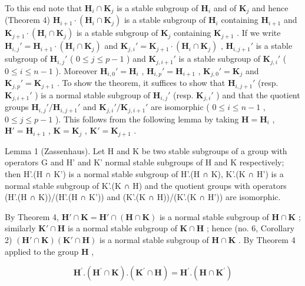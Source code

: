 To this end note that \(\mathbf{H}_i \cap \mathbf{K}_j\) is a stable subgroup of \(\mathbf{H}_i\) and of \(\mathbf{K}_j\) and hence (Theorem 4) \(\mathbf{H}_{i+1} \cdot (\mathbf{H}_i \cap \mathbf{K}_j)\) is a stable subgroup of \(\mathbf{H}_i\) containing \(\mathbf{H}_{i+1}\) and \(\mathbf{K}_{j+1} \cdot (\mathbf{H}_i \cap \mathbf{K}_j)\) is a stable subgroup of \(\mathbf{K}_j\) containing \(\mathbf{K}_{j+1}\) . If we write \(\mathbf{H}_{i,j}' = \mathbf{H}_{i+1} \cdot (\mathbf{H}_i \cap \mathbf{K}_j)\) and \(\mathbf{K}_{j,i}' = \mathbf{K}_{j+1} \cdot (\mathbf{H}_i \cap \mathbf{K}_j)\) , \(\mathbf{H}_{i,j+1}'\) is a stable subgroup of \(\mathbf{H}_{i,j}'\) ( \(0 \leqslant j \leqslant p-1\) ) and \(\mathbf{K}_{j,i+1}'\) is a stable subgroup of \(\mathbf{K}_{j,i}'\) ( \(0 \leqslant i \leqslant n-1\) ). Moreover \(\mathbf{H}_{i,0}' = \mathbf{H}_i\) , \(\mathbf{H}_{i,p}' = \mathbf{H}_{i+1}\) , \(\mathbf{K}_{j,0}' = \mathbf{K}_j\) and \(\mathbf{K}_{j,p}' = \mathbf{K}_{j+1}\) . To show the theorem, it suffices to show that \(\mathbf{H}_{i,j+1}'\) (resp. \(\mathbf{K}_{j,i+1}'\) ) is a normal stable subgroup of \(\mathbf{H}_{i,j}'\) (resp. \(\mathbf{K}_{j,i}'\) ) and that the quotient groups \(\mathbf{H}_{i,j}'/\mathbf{H}_{i,j+1}'\) and \(\mathbf{K}_{j,i}'/\mathbf{K}_{j,i+1}'\) are isomorphic ( \(0 \leqslant i \leqslant n-1\) , \(0 \leqslant j \leqslant p-1\) ). This follows from the following lemma by taking \(\mathbf{H} = \mathbf{H}_i\) , \(\mathbf{H}' = \mathbf{H}_{i+1}\) , \(\mathbf{K} = \mathbf{K}_j\) , \(\mathbf{K}' = \mathbf{K}_{j+1}\) .

Lemma 1 (Zassenhaus). Let H and K be two stable subgroups of a group with operators G and H' and K' normal stable subgroups of H and K respectively; then H'.(H ∩ K') is a normal stable subgroup of H'.(H ∩ K), K'.(K ∩ H') is a normal stable subgroup of K'.(K ∩ H) and the quotient groups with operators (H'.(H ∩ K))/(H'.(H ∩ K')) and (K'.(K ∩ H))/(K'.(K ∩ H')) are isomorphic.

By Theorem 4, \(\mathbf{H}' \cap \mathbf{K} = \mathbf{H}' \cap (\mathbf{H} \cap \mathbf{K})\) is a normal stable subgroup of \(\mathbf{H} \cap \mathbf{K}\) ; similarly \(\mathbf{K}' \cap \mathbf{H}\) is a normal stable subgroup of \(\mathbf{K} \cap \mathbf{H}\) ; hence (no. 6, Corollary 2) \((\mathbf{H}' \cap \mathbf{K})(\mathbf{K}' \cap \mathbf{H})\) is a normal stable subgroup of \(\mathbf{H} \cap \mathbf{K}\) . By Theorem 4 applied to the group \(\mathbf{H}\) ,

\[
\mathbf {H} ^ {\prime}. (\mathbf {H} ^ {\prime} \cap \mathbf {K}). (\mathbf {K} ^ {\prime} \cap \mathbf {H}) = \mathbf {H} ^ {\prime}. (\mathbf {H} \cap \mathbf {K} ^ {\prime})
\]

